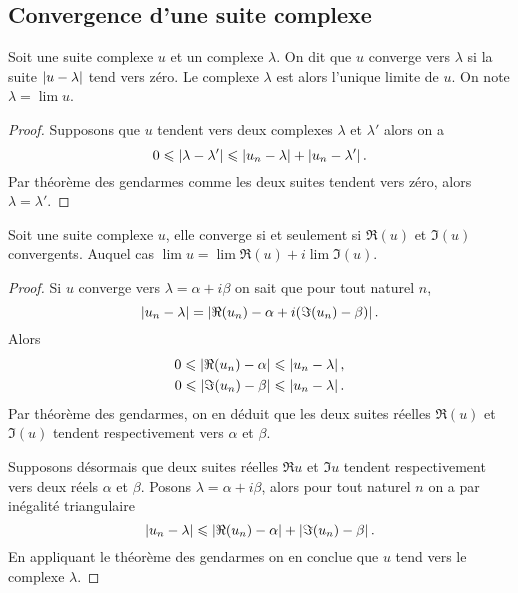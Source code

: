 \subsection{Convergence d'une suite complexe}

\begin{defdef}
  Soit une suite complexe \(u\) et un complexe \(\lambda\). On dit que \(u\) converge vers \(\lambda\) si la suite \(\left\lvert u-\lambda\right\rvert\) tend vers zéro. Le complexe \(\lambda\) est alors l'unique limite de \(u\). On note \(\lambda = \lim u\).
\end{defdef}
\begin{proof}
  Supposons que \(u\) tendent vers deux complexes \(\lambda\) et \(\lambda'\) alors on a
  \begin{equation}
    0 \leqslant \left\lvert\lambda - \lambda'\right\rvert \leqslant \left\lvert u_n-\lambda\right\rvert + \left\lvert u_n-\lambda'\right\rvert.
  \end{equation}
Par théorème des gendarmes comme les deux suites tendent vers zéro, alors \(\lambda = \lambda'\).
\end{proof}

\begin{prop}
  Soit une suite complexe \(u\), elle converge si et seulement si \(\Re(u)\) et \(\Im(u)\) convergents. Auquel cas \(\lim u = \lim \Re(u) + i \lim \Im(u)\).
\end{prop}
\begin{proof}
  Si \(u\) converge vers \(\lambda = \alpha+ i \beta\) on sait que pour tout naturel \(n\), 
  \begin{equation}
  \left\lvert u_n-\lambda\right\rvert = \left\lvert\Re(u_n)-\alpha + i(\Im(u_n)-\beta)\right\rvert. 
  \end{equation}
  Alors
  \begin{align}
    0 \leqslant \left\lvert\Re(u_n) -\alpha\right\rvert \leqslant \left\lvert u_n-\lambda\right\rvert, \\ 
    0 \leqslant \left\lvert\Im(u_n) -\beta\right\rvert \leqslant \left\lvert u_n-\lambda\right\rvert.
  \end{align}
  Par théorème des gendarmes, on en déduit que les deux suites réelles \(\Re(u)\) et \(\Im(u)\) tendent respectivement vers \(\alpha\) et \(\beta\).

  Supposons désormais que deux suites réelles \(\Re u\) et \(\Im u\) tendent respectivement vers deux réels \(\alpha\) et \(\beta\). Posons \(\lambda = \alpha + i \beta\), alors pour tout naturel \(n\) on a par inégalité triangulaire
\begin{equation}
  \left\lvert u_n-\lambda\right\rvert \leqslant \left\lvert\Re(u_n) - \alpha\right\rvert + \left\lvert\Im(u_n) - \beta\right\rvert.
\end{equation}
En appliquant le théorème des gendarmes on en conclue que \(u\) tend vers le complexe \(\lambda\).
\end{proof}

